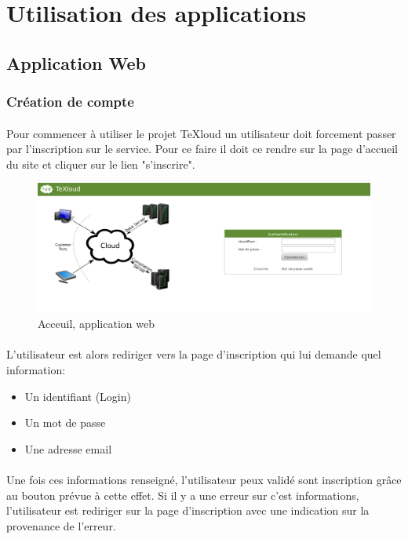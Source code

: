 \documentclass[a4paper,12pt]{article}
\begin{document}
\newpage
\section{Utilisation des applications}
\subsection{Application Web}
\subsubsection{Création de compte}
\paragraph*{}
Pour commencer à utiliser le projet TeXloud un utilisateur doit forcement passer par l'inscription sur le service. Pour ce faire il doit ce rendre sur la page d'accueil du site et cliquer sur le lien "s'inscrire".

\begin{figure}[!ht]
\begin{center}
  \includegraphics[width=1\textwidth]{./images/screenshot/Acceuil.png}
\end{center}
  \caption{Acceuil, application web}
  \label{acceuilWeb}
\end{figure}

\clearpage
\paragraph*{}
L'utilisateur est alors rediriger vers la page d'inscription qui lui demande quel information:
\begin{itemize}
 \item Un identifiant (Login)
 \item Un mot de passe 
 \item Une adresse email
\end{itemize}
\paragraph*{}
Une fois ces informations renseigné, l'utilisateur peux validé sont inscription grâce au bouton prévue à cette effet. Si il y a une erreur sur c'est informations, l'utilisateur est rediriger sur la page d'inscription avec une indication sur la provenance de l'erreur.
\end{document}
